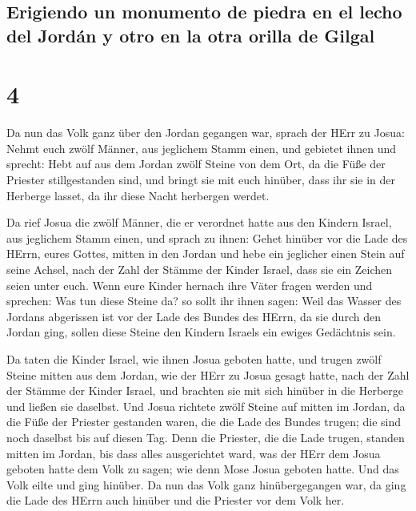 \hypertarget{erigiendo-un-monumento-de-piedra-en-el-lecho-del-jorduxe1n-y-otro-en-la-otra-orilla-de-gilgal}{%
\subsection{Erigiendo un monumento de piedra en el lecho del Jordán y
otro en la otra orilla de
Gilgal}\label{erigiendo-un-monumento-de-piedra-en-el-lecho-del-jorduxe1n-y-otro-en-la-otra-orilla-de-gilgal}}

\hypertarget{section-3}{%
\section{4}\label{section-3}}

 Da nun das Volk ganz über den Jordan gegangen war, sprach
der HErr zu Josua:  Nehmt euch zwölf Männer, aus jeglichem
Stamm einen,  und gebietet ihnen und sprecht: Hebt auf aus
dem Jordan zwölf Steine von dem Ort, da die Füße der Priester
stillgestanden sind, und bringt sie mit euch hinüber, dass ihr sie in
der Herberge lasset, da ihr diese Nacht herbergen werdet.

 Da rief Josua die zwölf Männer, die er verordnet hatte
aus den Kindern Israel, aus jeglichem Stamm einen,  und
sprach zu ihnen: Gehet hinüber vor die Lade des HErrn, eures Gottes,
mitten in den Jordan und hebe ein jeglicher einen Stein auf seine
Achsel, nach der Zahl der Stämme der Kinder Israel,  dass
sie ein Zeichen seien unter euch. Wenn eure Kinder hernach ihre Väter
fragen werden und sprechen: Was tun diese Steine da?  so
sollt ihr ihnen sagen: Weil das Wasser des Jordans abgerissen ist vor
der Lade des Bundes des HErrn, da sie durch den Jordan ging, sollen
diese Steine den Kindern Israels ein ewiges Gedächtnis sein.

 Da taten die Kinder Israel, wie ihnen Josua geboten
hatte, und trugen zwölf Steine mitten aus dem Jordan, wie der HErr zu
Josua gesagt hatte, nach der Zahl der Stämme der Kinder Israel, und
brachten sie mit sich hinüber in die Herberge und ließen sie daselbst.
 Und Josua richtete zwölf Steine auf mitten im Jordan, da
die Füße der Priester gestanden waren, die die Lade des Bundes trugen;
die sind noch daselbst bis auf diesen Tag.  Denn die
Priester, die die Lade trugen, standen mitten im Jordan, bis dass alles
ausgerichtet ward, was der HErr dem Josua geboten hatte dem Volk zu
sagen; wie denn Mose Josua geboten hatte. Und das Volk eilte und ging
hinüber.  Da nun das Volk ganz hinübergegangen war, da
ging die Lade des HErrn auch hinüber und die Priester vor dem Volk her.

